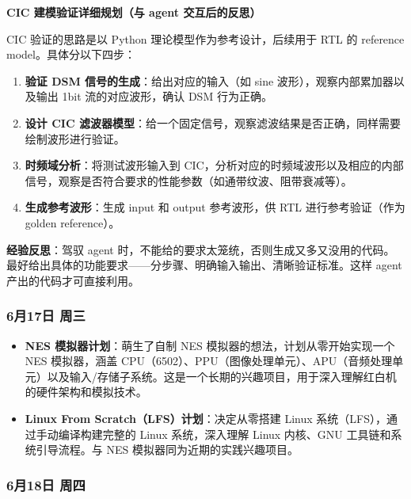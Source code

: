 \begin{personalnote}
\textbf{CIC 建模验证详细规划（与 agent 交互后的反思）}

CIC 验证的思路是以 Python 理论模型作为参考设计，后续用于 RTL 的 reference model。具体分以下四步：

\begin{enumerate}
  \item \textbf{验证 DSM 信号的生成}：给出对应的输入（如 sine 波形），观察内部累加器以及输出 1bit 流的对应波形，确认 DSM 行为正确。
  \item \textbf{设计 CIC 滤波器模型}：给一个固定信号，观察滤波结果是否正确，同样需要绘制波形进行验证。
  \item \textbf{时频域分析}：将测试波形输入到 CIC，分析对应的时频域波形以及相应的内部信号，观察是否符合要求的性能参数（如通带纹波、阻带衰减等）。
  \item \textbf{生成参考波形}：生成 input 和 output 参考波形，供 RTL 进行参考验证（作为 golden reference）。
\end{enumerate}

\textbf{经验反思}：驾驭 agent 时，不能给的要求太笼统，否则生成又多又没用的代码。最好给出具体的功能要求——分步骤、明确输入输出、清晰验证标准。这样 agent 产出的代码才可直接利用。

\end{personalnote}

\subsubsection{6月17日 周三}

\begin{itemize}
  \item \textbf{NES 模拟器计划}：萌生了自制 NES 模拟器的想法，计划从零开始实现一个 NES 模拟器，涵盖 CPU（6502）、PPU（图像处理单元）、APU（音频处理单元）以及输入/存储子系统。这是一个长期的兴趣项目，用于深入理解红白机的硬件架构和模拟技术。
  \item \textbf{Linux From Scratch（LFS）计划}：决定从零搭建 Linux 系统（LFS），通过手动编译构建完整的 Linux 系统，深入理解 Linux 内核、GNU 工具链和系统引导流程。与 NES 模拟器同为近期的实践兴趣项目。
\end{itemize}

\subsubsection{6月18日 周四}

